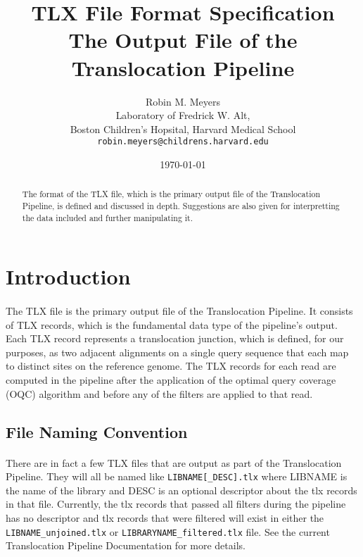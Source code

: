 \documentclass{article}
\begin{document}
\title{TLX File Format Specification \\ \large The Output File of the Translocation Pipeline}
\author{Robin M. Meyers\\
  Laboratory of Fredrick W. Alt,\\
  Boston Children's Hopsital, Harvard Medical School\\
  \texttt{robin.meyers@childrens.harvard.edu}}
\date{\today}
\maketitle

\begin{abstract}
The format of the TLX file, which is the primary output file of the Translocation Pipeline, is defined and discussed in depth. Suggestions are also given for interpretting the data included and further manipulating it. 
\end{abstract}

\section{Introduction}
\paragraph{} The TLX file is the primary output file of the Translocation Pipeline. It consists of TLX records, which is the fundamental data type of the pipeline's output. Each TLX record represents a translocation junction, which is defined, for our purposes, as two adjacent alignments on a single query sequence that each map to distinct sites on the reference genome. The TLX records for each read are computed in the pipeline after the application of the optimal query coverage (OQC) algorithm and before any of the filters are applied to that read. 

\subsection{File Naming Convention}
\paragraph{} There are in fact a few TLX files that are output as part of the Translocation Pipeline. They will all be named like \texttt{LIBNAME[\_DESC].tlx} where LIBNAME is the name of the library and DESC is an optional descriptor about the tlx records in that file. Currently, the tlx records that passed all filters during the pipeline has no descriptor and tlx records that were filtered will exist in either the \texttt{LIBNAME\_unjoined.tlx} or \texttt{LIBRARYNAME\_filtered.tlx} file. See the current Translocation Pipeline Documentation for more details.
\end{document}
